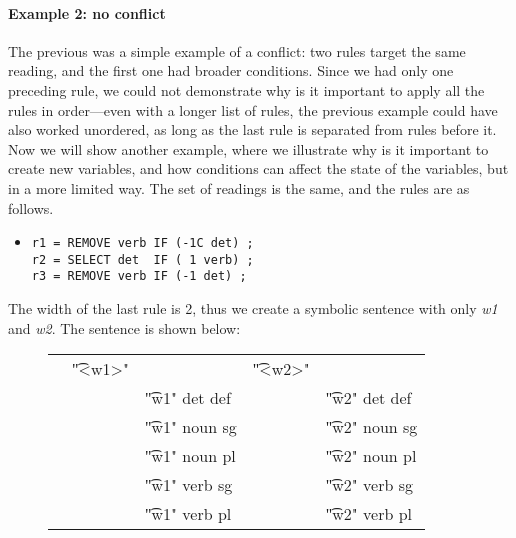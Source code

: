 \paragraph{Example 2: no conflict}
The previous was a simple example of a conflict: two rules target the same reading, and the first one had broader conditions. 
Since we had only one preceding rule, we could not demonstrate why is it important to apply all the rules in order---even with a longer list of rules, the previous example could have also worked unordered, as long as the last rule is separated from rules before it.
Now we will show another example, where we illustrate why is it important to create new variables, and how conditions can affect the state of the variables, but in a more limited way. The set of readings is the same, and the rules are as follows.

\begin{itemize}
\item[] 
\begin{verbatim}
r1 = REMOVE verb IF (-1C det) ;
r2 = SELECT det  IF ( 1 verb) ;
r3 = REMOVE verb IF (-1 det) ;
\end{verbatim}
\end{itemize}

\noindent The width of the last rule is 2, thus we create a symbolic sentence with only {\em w1} and {\em w2}. The sentence is shown below:

\begin{figure}[h]
\begin{tabular}{p{0.2cm} p{0.6cm} l  p{0.6cm} l }
& \t{"<w1>"}    &                     &  \t{"<w2>"}  &           \\
&              & \t{"w1" det def}    & &      \t{"w2" det def}  \\
&              & \t{"w1" noun sg}    & &      \t{"w2" noun sg}  \\
&              & \t{"w1" noun pl}    & &      \t{"w2" noun pl}  \\
&              & \t{"w1" verb sg}    & &      \t{"w2" verb sg}  \\
&              & \t{"w1" verb pl}    & &      \t{"w2" verb pl}  \\
\end{tabular}
\end{figure}



